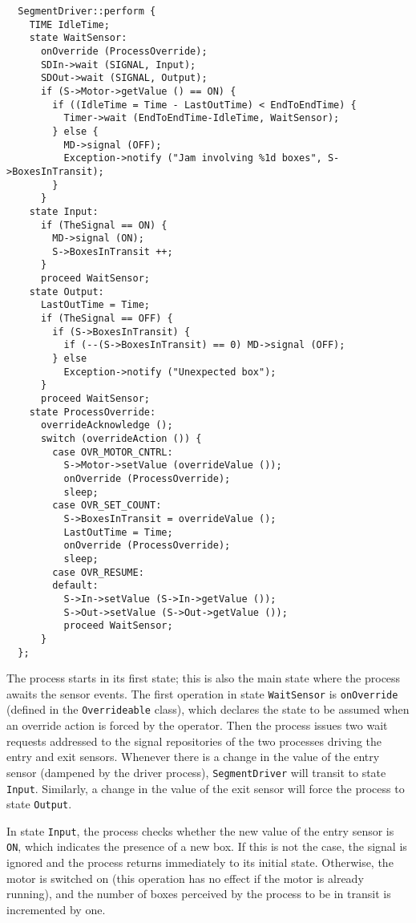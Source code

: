 {\small\begin{verbatim}
  SegmentDriver::perform {
    TIME IdleTime;
    state WaitSensor:
      onOverride (ProcessOverride);
      SDIn->wait (SIGNAL, Input);
      SDOut->wait (SIGNAL, Output);
      if (S->Motor->getValue () == ON) {
        if ((IdleTime = Time - LastOutTime) < EndToEndTime) {
          Timer->wait (EndToEndTime-IdleTime, WaitSensor);
        } else {
          MD->signal (OFF);
          Exception->notify ("Jam involving %1d boxes", S->BoxesInTransit);
        }
      }
    state Input:
      if (TheSignal == ON) {
        MD->signal (ON);
        S->BoxesInTransit ++;
      }
      proceed WaitSensor;
    state Output:
      LastOutTime = Time;
      if (TheSignal == OFF) {
        if (S->BoxesInTransit) {
          if (--(S->BoxesInTransit) == 0) MD->signal (OFF);
        } else
          Exception->notify ("Unexpected box");
      }
      proceed WaitSensor;
    state ProcessOverride:
      overrideAcknowledge ();
      switch (overrideAction ()) {
        case OVR_MOTOR_CNTRL:
          S->Motor->setValue (overrideValue ());
          onOverride (ProcessOverride);
          sleep;
        case OVR_SET_COUNT:
          S->BoxesInTransit = overrideValue ();
          LastOutTime = Time;
          onOverride (ProcessOverride);
          sleep;
        case OVR_RESUME:
        default:
          S->In->setValue (S->In->getValue ());
          S->Out->setValue (S->Out->getValue ());
          proceed WaitSensor;
      }
  };
\end{verbatim}}

The process starts in its first state; this is also the main state where
the process awaits the sensor events.
The first operation in state {\tt WaitSensor} is
{\tt onOverride} (defined in the {\tt Overrideable} class), which
declares the state to be assumed when an override action is forced by the
operator.
Then the process issues two wait requests addressed to the signal repositories
of the two processes driving the entry and exit sensors.
Whenever there is a change in the value of the entry sensor (dampened by the
driver process), {\tt SegmentDriver} will transit to state {\tt Input}.
Similarly, a change in the value of the exit sensor will force the
process to state {\tt Output}.

In state {\tt Input}, the process checks whether the new value of the
entry sensor is {\tt ON}, which indicates the presence of a new box.
If this is not the case, the signal is ignored and the process returns
immediately to its initial state.
Otherwise, the motor is switched on (this operation has no effect if the
motor is already running),
and the number of boxes perceived by the process to be in transit is
incremented by one.


